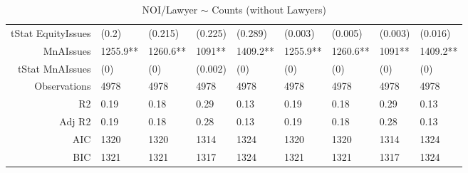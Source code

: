 \begin{table}[ht]
\begin{tabular}{rllllllll}
  tStat EquityIssues & (0.2) & (0.215) & (0.225) & (0.289) & (0.003) & (0.005) & (0.003) & (0.016) \\ 
  MnAIssues & 1255.9** & 1260.6** & 1091** & 1409.2** & 1255.9** & 1260.6** & 1091** & 1409.2** \\ 
  tStat MnAIssues & (0) & (0) & (0.002) & (0) & (0) & (0) & (0) & (0) \\ 
  Observations & 4978 & 4978 & 4978 & 4978 & 4978 & 4978 & 4978 & 4978 \\ 
  R2 & 0.19 & 0.18 & 0.29 & 0.13 & 0.19 & 0.18 & 0.29 & 0.13 \\ 
  Adj R2 & 0.19 & 0.18 & 0.28 & 0.13 & 0.19 & 0.18 & 0.28 & 0.13 \\ 
  AIC & 1320 & 1320 & 1314 & 1324 & 1320 & 1320 & 1314 & 1324 \\ 
  BIC & 1321 & 1321 & 1317 & 1324 & 1321 & 1321 & 1317 & 1324 \\ 
   \hline
\end{tabular}
\caption{NOI/Lawyer $\sim$ Counts (without Lawyers)} 
\end{table}
